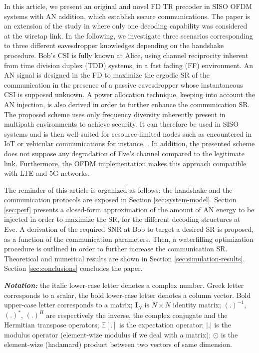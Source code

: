 \documentclass[journal,comsoc]{IEEEtran}
\newcommand{\module}[1]{\left|#1\right|}
\newcommand{\EX}[1]{\mathbb{E} \left[#1\right]}%
\begin{document}
In this article, we present an original and novel FD TR precoder in SISO OFDM systems with AN addition,  which establish secure communications. The paper is an extension of the study in \cite{9049811} where only one decoding capability was considered at the wiretap link. In the following, we investigate three scenarios corresponding to three different eavesdropper knowledges depending on the handshake procedure.  Bob's CSI is fully known at Alice, using channel reciprocity inherent from time division duplex (TDD) systems, in a fast fading (FF) environment. An AN signal is designed in the FD to maximize the ergodic SR of the communication in the presence of a passive eavesdropper whose instantaneous CSI is supposed unknown. A power allocation technique, keeping into account the AN injection, is also derived in order to further enhance the communication SR. The proposed scheme uses only frequency diversity inherently present in multipath environments to achieve security. It can therefore be used in SISO systems and is then well-suited for resource-limited nodes such as encountered in IoT or vehicular communications for instance, \cite{9049811}. In addition, the presented scheme does not suppose any degradation of Eve's channel compared to the legitimate link. Furthermore, the OFDM implementation makes this approach compatible with LTE and 5G networks.

The reminder of this article is organized as follows: the handshake and the communication protocols are exposed in Section \ref{sec:system-model}. Section \ref{sec:perf} presents a closed-form approximation of the amount of AN energy to be injected in order to maximize the SR, for the different decoding structures at Eve. A derivation of the required SNR at Bob to target a desired SR is proposed, as a function of the communication parameters. Then, a waterfilling optimization procedure is outlined in order to further increase the communication SR. Theoretical and numerical results are shown in Section \ref{sec:simulation-results}. Section \ref{sec:conclusions} concludes the paper.

\textit{\textbf{Notation:}} the italic lower-case letter denotes a complex number. Greek letter corresponds to a scalar, the bold lower-case letter denotes a column vector. Bold upper-case letter corresponds to a matrix; $\textbf{I}_N$ is $N \times N$ identity matrix; $(.)^{-1}$, $(.)^{*}$, $(.)^{H}$ are respectively the inverse, the complex conjugate and the Hermitian transpose operators; $\EX{.}$ is the expectation operator; $\module{.}$ is the modulus operator (element-wize modulus if we deal with a matrix); $\odot$ is the element-wize (hadamard) product between two vectors of same dimension.
\end{document}
